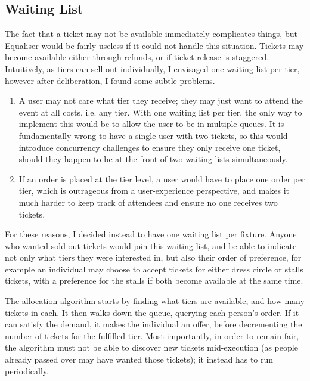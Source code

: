 \documentclass[12pt,a4]{bhamdissertation}
\begin{document}
\subsection{Waiting List}

The fact that a ticket may not be available immediately complicates things, but Equaliser would be fairly useless if it could not handle this situation. Tickets may become available either through refunds, or if ticket release is staggered. Intuitively, as tiers can sell out individually, I envisaged one waiting list per tier, however after deliberation, I found some subtle problems.

\begin{enumerate}
    \item A user may not care what tier they receive; they may just want to attend the event at all costs, i.e. any tier. With one waiting list per tier, the only way to implement this would be to allow the user to be in multiple queues. It is fundamentally wrong to have a single user with two tickets, so this would introduce concurrency challenges to ensure they only receive one ticket, should they happen to be at the front of two waiting lists simultaneously.
    \item If an order is placed at the tier level, a user would have to place one order per tier, which is outrageous from a user-experience perspective, and makes it much harder to keep track of attendees and ensure no one receives two tickets.
\end{enumerate}

For these reasons, I decided instead to have one waiting list per fixture. Anyone who wanted sold out tickets would join this waiting list, and be able to indicate not only what tiers they were interested in, but also their order of preference, for example an individual may choose to accept tickets for either dress circle or stalls tickets, with a preference for the stalls if both become available at the same time.

The allocation algorithm starts by finding what tiers are available, and how many tickets in each. It then walks down the queue, querying each person's order. If it can satisfy the demand, it makes the individual an offer, before decrementing the number of tickets for the fulfilled tier. Most importantly, in order to remain fair, the algorithm must not be able to discover new tickets mid-execution (as people already passed over may have wanted those tickets); it instead has to run periodically.
\end{document}
